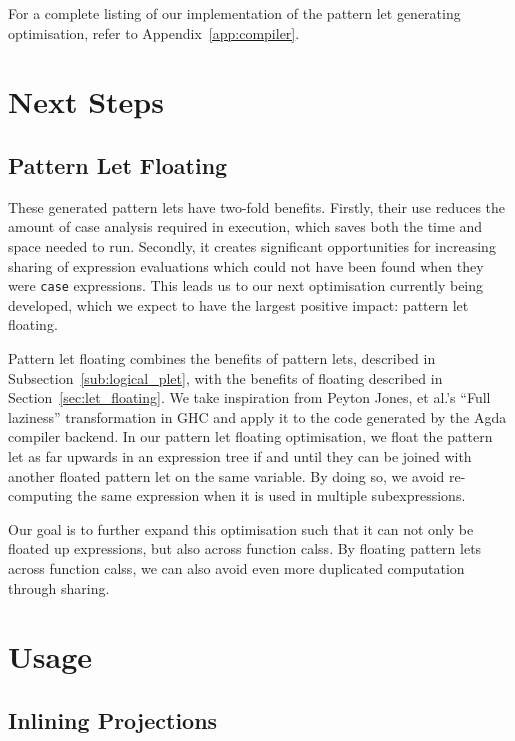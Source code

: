 For a complete listing of our implementation of the pattern let generating optimisation, refer to Appendix~\ref{app:compiler}.

\section{Next Steps}
\label{sec:next_steps}

\subsection{Pattern Let Floating}

These generated pattern lets have two-fold benefits. Firstly, their use reduces the amount of case analysis required in execution, which saves both the time and space needed to run. Secondly, it creates significant opportunities for increasing sharing of expression evaluations which could not have been found when they were \lstinline{case} expressions. This leads us to our next optimisation currently being developed, which we expect to have the largest positive impact: pattern let floating.

Pattern let floating combines the benefits of pattern lets, described in Subsection~\ref{sub:logical_plet}, with the benefits of floating described in Section~\ref{sec:let_floating}. We take inspiration from Peyton Jones, et al.'s ``Full laziness'' transformation in GHC and apply it to the code generated by the Agda compiler backend.\cite{jones1996} In our pattern let floating optimisation, we float the pattern let as far upwards in an expression tree if and until they can be joined with another floated pattern let on the same variable.  By doing so, we avoid re-computing the same expression when it is used in multiple subexpressions.

Our goal is to further expand this optimisation such that it can not only be floated up expressions, but also across function calss. By floating pattern lets across function calss, we can also avoid even more duplicated computation through sharing.

\section{Usage}
\label{sec:usage}

\subsection{Inlining Projections}


